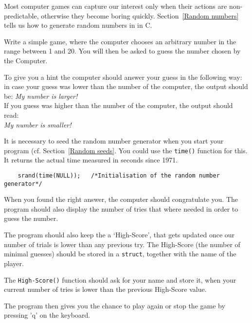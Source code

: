 
\begin{exercise}

Most computer games can capture our interest only when their actions are
non-predictable, otherwise they become boring quickly.
Section~\ref{Random numbers} tells us how to generate random numbers in
in C. 


Write a simple game, where the computer chooses an arbitrary number in
the range between 1 and 20. You will then be asked to guess the
number chosen by the Computer.

To give you a hint the computer should answer your guess in the following
way: in case your guess was lower than the number of the computer, the
output should be: \emph{My number is larger!} \\
If you guess was higher than
the number of the computer, the output should read: \\
\emph{My number is smaller!}

It is necessary to seed the random number generator when you start your program
(cf. Section~\ref{Random seeds}.
You could use the {\tt time()} function for this. It returns the actual time measured
in seconds since 1971.

\begin{verbatim}
    srand(time(NULL));   /*Initialisation of the random number generator*/
\end{verbatim}

When you found the right answer, the computer should congratulate you. The 
program should also display the number of tries that where needed in order
to guess the number. 

The program should also keep the a `High-Score', that gets updated once
our number of trials is lower than any previous try.
The High-Score (the number of minimal guesses) should be stored in a
 {\tt struct}, together with the name of the player.

The \texttt{High-Score()} function should ask for your name and store it, when 
your current number of tries is lower than the previous High-Score value. 

The program then gives you the chance to play again or stop the game by pressing
 'q' on the keyboard.



\end{exercise}


